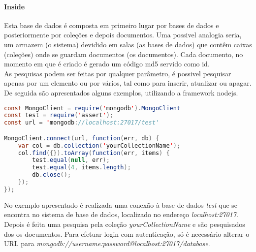 \paragraph{Inside}
Esta base de dados é composta em primeiro lugar por bases de dados e posteriormente por coleções e depois documentos. Uma possivel analogia seria, um armazem (o sistema) devidido em salas (as bases de dados) que contêm caixas (coleções) onde se guardam documentos (os documentos). Cada documento, no momento em que é criado é gerado um código md5 servido como id.\newline \\
As pesquisas podem ser feitas por qualquer parâmetro, é possivel pesquisar apenas por um elemento ou por vários, tal como para inserir, atualizar ou apagar.\newline
De seguida são apresentados alguns exemplos, utilizando a framework nodejs.
\begin{lstlisting}[language=java]
const MongoClient = require('mongodb').MongoClient
const test = require('assert');
const url = 'mongodb://localhost:27017/test'

MongoClient.connect(url, function(err, db) {
    var col = db.collection('yourCollectionName');
    col.find({}).toArray(function(err, items) {
        test.equal(null, err);
        test.equal(4, items.length);
        db.close();
    });
});
\end{lstlisting}
No exemplo apresentado é realizada uma conexão à base de dados \textit{test} que se encontra no sistema de base de dados, localizado no endereço \textit{localhost:27017}.\newline
Depois é feita uma pesquisa pela coleção \textit{yourCollectionName} e são pesquisados dos os documentos.
Para efetuar login com autenticação, só é necessário alterar o URL para \textit{mongodb://username:password@localhost:27017/database}.
